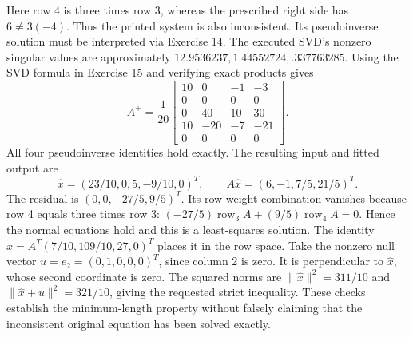 Here row 4 is three times row 3, whereas the prescribed right side has
$6\ne3(-4)$. Thus the printed system is also inconsistent.
Its pseudoinverse solution must be interpreted via Exercise 14.
The executed SVD's nonzero singular values are approximately
$12.9536237,1.44552724,.337763285$.
Using the SVD formula in Exercise 15 and verifying exact products gives
\[
 A^+=\frac1{20}\begin{bmatrix}
 10&0&-1&-3\\0&0&0&0\\0&40&10&30\\
 10&-20&-7&-21\\0&0&0&0
 \end{bmatrix}.
\]
All four pseudoinverse identities hold exactly.
The resulting input and fitted output are
\[
 \widehat x=(23/10,0,5,-9/10,0)^T,
 \qquad A\widehat x=(6,-1,7/5,21/5)^T.
\]
The residual is $(0,0,-27/5,9/5)^T$.
Its row-weight combination vanishes because row 4 equals three times row 3:
$(-27/5)\operatorname{row}_3A+(9/5)\operatorname{row}_4A=0$.
Hence the normal equations hold and this is a least-squares solution.
The identity
$\widehat x=A^T(7/10,109/10,27,0)^T$
places it in the row space.
Take the nonzero null vector $u=e_2=(0,1,0,0,0)^T$, since column 2 is zero.
It is perpendicular to $\widehat x$, whose second coordinate is zero.
The squared norms are $\|\widehat x\|^2=311/10$ and
$\|\widehat x+u\|^2=321/10$, giving the requested strict inequality.
These checks establish the minimum-length property without falsely claiming
that the inconsistent original equation has been solved exactly.
